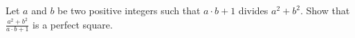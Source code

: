Let $ a$ and $ b$ be two positive integers such that $ a \cdot b + 1$ divides $ a^{2} + b^{2}$. Show that $ \frac {a^{2} + b^{2}}{a \cdot b + 1}$ is a perfect square.
